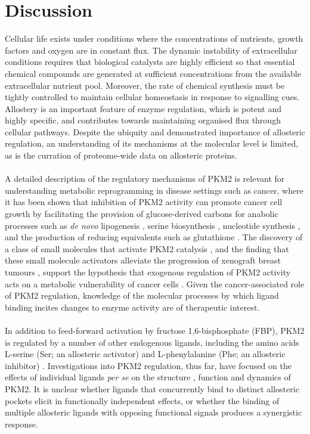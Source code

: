 \chapter{Discussion}
Cellular life exists under conditions where the concentrations of nutrients, growth factors and oxygen are in constant flux. The dynamic instability of extracellular conditions requires that biological catalysts are highly efficient so that essential chemical compounds are generated at sufficient concentrations from the available extracellular nutrient pool. Moreover, the rate of chemical synthesis must be tightly controlled to maintain cellular homeostasis in response to signalling cues. Allostery is an important feature of enzyme regulation, which is potent and highly specific, and contributes towards maintaining organised flux through cellular pathways. Despite the ubiquity and demonstrated importance of allosteric regulation, an understanding of its mechanisms at the molecular level is limited, as is the curration of proteome-wide data on allosteric proteins.
%
%
\\\\
%
%
A detailed description of the regulatory mechanisms of PKM2 is relevant for understanding metabolic reprogramming in disease settings such as cancer, where it has been shown that inhibition of PKM2 activity can promote cancer cell growth by facilitating the provision of glucose-derived carbons for anabolic processes such as \textit{de novo} lipogenesis \cite{Anastasiou:2012aa}, serine biosynthesis \cite{Chaneton:2012aa}, nucleotide synthesis \cite{Kim:2015aa,Anastasiou:2012aa}, and the production of reducing equivalents such as glutathione \cite{Anastasiou:2011aa}. The discovery of a class of small molecules that activate PKM2 catalysis \cite{Walsh:2011aa,Boxer:2010aa,Jiang:2010aa}, and the finding that these small molecule activators alleviate the progression of xenograft breast tumours \cite{Anastasiou:2012aa}, support the hypothesis that exogenous regulation of PKM2 activity acts on a metabolic vulnerability of cancer cells \cite{Vander-Heiden:2011aa,Dayton:2016ab,Israelsen:2015aa,Vander-Heiden:2009aa}. Given the cancer-associated role of PKM2 regulation, knowledge of the molecular processes by which ligand binding incites changes to enzyme activity are of therapeutic interest. 
%
%
\\\\
%
%
In addition to feed-forward activation by fructose 1,6-bisphosphate (FBP), PKM2 is regulated by a number of other endogenous ligands, including the amino acids L-serine (Ser; an allosteric activator) \cite{Eigenbrodt:1983aa} and L-phenylalanine (Phe; an allosteric inhibitor) \cite{Feliu:1976aa}. Investigations into PKM2 regulation, thus far, have focused on the effects of individual ligands \textit{per se} on the structure \cite{Anastasiou:2012aa,Dombrauckas:2005aa,Yuan:2018aa,Gavriilidou:2018aa}, function \cite{Anastasiou:2012aa,Chaneton:2012aa,Christofk:2008aa} and dynamics \cite{Naithani:2015aa,Yan:2016aa,Zhong:2017aa} of PKM2. It is unclear whether ligands that concurrently bind to distinct allosteric pockets elicit in functionally independent effects, or whether the binding of multiple allosteric ligands with opposing functional signals produces a synergistic response.
